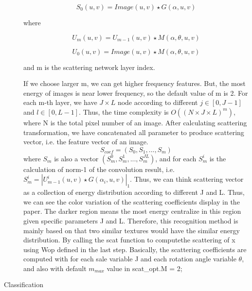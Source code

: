 \documentclass[final,leqno,onefignum,onetabnum]{siamltexmm}
\begin{document}
\begin{description}
	\begin{equation}
		S_0(u,v) = Image(u,v) \star G(\alpha, u, v)
	\end{equation}
	
	where 
	
	\begin{equation}
		U_m(u,v) = U_{m-1}(u,v) \star M(\alpha, \theta, u, v)
	\end{equation}
	
	\begin{equation}
		U_0(u,v) = Image(u,v) \star M(\alpha, \theta, u, v)
	\end{equation}
	
	and m is the scattering network layer index.
	
	If we choose larger m, we can get higher frequency features. But, the most energy of images is near lower frequency, so the default value of m is 2. For each m-th layer, we have $J \times L$ node according to different $j \in [0, J-1]$ and $l \in [0, L-1]$.
	Thus, the time complexity is $O((N \times J \times L)^m)$, where N is the total pixel number of an image.
	After calculating scattering transformation, we have concatenated all parameter to produce scattering vector, i.e. the feature vector of an image.
	\begin{equation}
		S_{coef} = (S_0, S_1, ..., S_m) 
	\end{equation}
	where $S_m$ is also a vector $ (S_m^{0}, S_m^{1}, ..., S_m^{JL}) $, and for each $S_m^{i}$ is the calculation of norm-1 of the convolution result, i.e. 
	$S_m^{i} = | U_{m-1}^{i}(u,v) \star G(\alpha_i, u, v) |_1$. Thus, we can think scattering vector as a collection of energy distribution according to different J and L. Thus, we can see the color variation of the scattering coefficients display in the paper. The darker region means the most energy centralize in this region given specific parameters J and L. Therefore, this recognition method is mainly based on that two similar textures would have the similar energy distribution. 
	By calling the scat function to computethe scattering of x using Wop defined in the last step. Basically, the scattering coefficients are computed with for each sale variable J and each rotation angle variable $\theta$, and also with default $m_{max}$ value in scat\_opt.M = 2;
	\item[Classification] 

\end{description}
\end{document}
